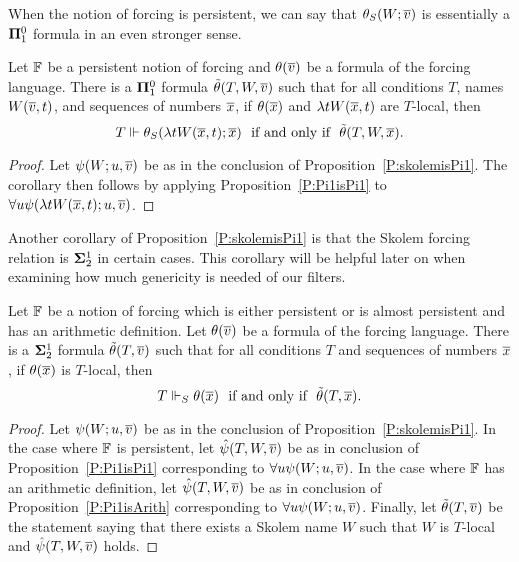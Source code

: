 When the notion of forcing is persistent, we can say that $\theta_S(W;\overline{v})$
is essentially a $\mathbf{\Pi}^0_1$ formula in an even stronger sense.

\begin{cor}[\RCAo]\label{C:skolemisActualPi1}
Let $\mathbb{F}$ be a persistent notion of forcing and $\theta(\overline{v})$
be a formula of the forcing language.
There is a $\mathbf{\Pi}^0_1$ formula $\tilde{\theta}(T,W,\overline{v})$ such that
for all conditions $T$, names $W(\overline{v},t)$, and sequences of numbers $\overline{x}$,
if $\theta(\overline{x})$ and $\lambda tW(\overline{x},t)$ are $T$-local, then
$$T\Vdash\theta_S(\lambda tW(\tup{x},t);\tup{x})\ \ \text{if and only if}\ \ \tilde{\theta}(T,W,\tup{x}).$$
\end{cor}
\begin{proof}
Let $\psi(W;u,\overline{v})$ be as in the conclusion of Proposition~\ref{P:skolemisPi1}.
The corollary then follows by applying Proposition~\ref{P:Pi1isPi1} to $\forall u\psi(\lambda tW(\overline{x},t);u,\overline{v})$.
\end{proof}

Another corollary of Proposition~\ref{P:skolemisPi1}
is that the Skolem forcing relation is $\mathbf{\Sigma}^1_2$ in certain cases.
This corollary will be helpful later on when
examining how much genericity is needed of our filters.

\begin{cor}[\RCAo]\label{C:skolemisPi11}
Let $\mathbb{F}$ be a notion of forcing which is either persistent
or is almost persistent and has an arithmetic definition.
Let $\theta(\overline{v})$ be a formula of the forcing language.
There is a $\mathbf{\Sigma}^1_2$ formula $\tilde{\theta}(T,\overline{v})$ such that
for all conditions $T$ and sequences of numbers $\overline{x}$,
if $\theta(\overline{x})$ is $T$-local, then
$$T\Vdash_S\theta(\overline{x})\ \ \text{if and only if}\ \ \tilde{\theta}(T,\overline{x}).$$
\end{cor}
\begin{proof}
Let $\psi(W;u,\overline{v})$ be as in the conclusion of Proposition~\ref{P:skolemisPi1}.
In the case where $\mathbb{F}$ is persistent, let
$\hat{\psi}(T,W,\overline{v})$ be as in conclusion of Proposition~\ref{P:Pi1isPi1}
corresponding to $\forall u\psi(W;u,\overline{v})$.
In the case where $\mathbb{F}$ has an arithmetic definition, let
$\hat{\psi}(T,W,\overline{v})$ be as in conclusion of Proposition~\ref{P:Pi1isArith}
corresponding to $\forall u\psi(W;u,\overline{v})$.
Finally, let $\tilde{\theta}(T,\overline{v})$ be the statement saying that
there exists a Skolem name $W$ such that
$W$ is $T$-local and $\hat{\psi}(T,W,\overline{v})$ holds.
\end{proof}

